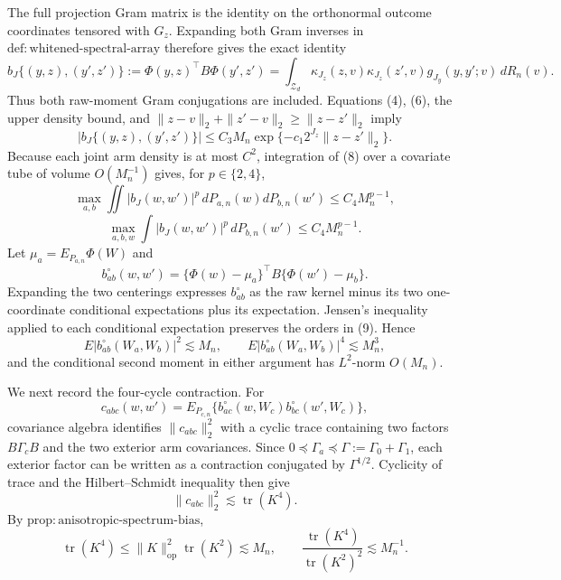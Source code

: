 The full projection Gram matrix is the identity on the orthonormal outcome coordinates tensored with \(G_z\). Expanding both Gram inverses in \(\mathrm{def{:}whitened\text{-}spectral\text{-}array}\) therefore gives the exact identity
\[
b_J\{(y,z),(y',z')\}
:=\Phi(y,z)^{\top}B\Phi(y',z')
=\int_{\mathcal Z_d}\kappa_{J_z}(z,v)\kappa_{J_z}(z',v)
g_{J_y}(y,y';v)\,dR_n(v). \tag{7}
\]
Thus both raw-moment Gram conjugations are included. Equations (4), (6), the upper density bound, and \(\|z-v\|_2+\|z'-v\|_2\ge\|z-z'\|_2\) imply
\[
|b_J\{(y,z),(y',z')\}|
\le C_3M_n\exp\{-c_1 2^{J_z}\|z-z'\|_2\}. \tag{8}
\]
Because each joint arm density is at most \(C^2\), integration of (8) over a covariate tube of volume \(O(M_n^{-1})\) gives, for \(p\in\{2,4\}\),
\[
\max_{a,b}\iint|b_J(w,w')|^p\,dP_{a,n}(w)dP_{b,n}(w')
\le C_4M_n^{p-1},
\]
\[
\max_{a,b,w}\int|b_J(w,w')|^p\,dP_{b,n}(w')
\le C_4M_n^{p-1}. \tag{9}
\]
Let \(\mu_a=E_{P_{a,n}}\Phi(W)\) and
\[
b_{ab}^{\circ}(w,w')=
\{\Phi(w)-\mu_a\}^{\top}B\{\Phi(w')-\mu_b\}.
\]
Expanding the two centerings expresses \(b_{ab}^{\circ}\) as the raw kernel minus its two one-coordinate conditional expectations plus its expectation. Jensen's inequality applied to each conditional expectation preserves the orders in (9). Hence
\[
E|b_{ab}^{\circ}(W_a,W_b)|^2\lesssim M_n,
\qquad
E|b_{ab}^{\circ}(W_a,W_b)|^4\lesssim M_n^3, \tag{10}
\]
and the conditional second moment in either argument has \(L^2\)-norm \(O(M_n)\).

We next record the four-cycle contraction. For
\[
c_{abc}(w,w')=E_{P_{c,n}}
\{b_{ac}^{\circ}(w,W_c)b_{bc}^{\circ}(w',W_c)\},
\]
covariance algebra identifies \(\|c_{abc}\|_2^2\) with a cyclic trace containing two factors \(B\Gamma_cB\) and the two exterior arm covariances. Since \(0\preceq\Gamma_a\preceq\Gamma:=\Gamma_0+\Gamma_1\), each exterior factor can be written as a contraction conjugated by \(\Gamma^{1/2}\). Cyclicity of trace and the Hilbert--Schmidt inequality then give
\[
\|c_{abc}\|_2^2\lesssim\operatorname{tr}(K^4).
\]
By \(\mathrm{prop{:}anisotropic\text{-}spectrum\text{-}bias}\),
\[
\operatorname{tr}(K^4)
\le\|K\|_{\mathrm{op}}^2\operatorname{tr}(K^2)\lesssim M_n,
\qquad
\frac{\operatorname{tr}(K^4)}{\operatorname{tr}(K^2)^2}\lesssim M_n^{-1}. \tag{11}
\]

